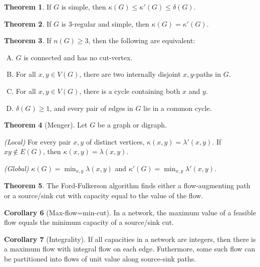 \documentclass{article}
\theoremstyle{definition}
\newtheorem{theorem}{Theorem}
\newtheorem{corollary}[theorem]{Corollary}
\begin{document}
\thispagestyle{empty}


\begin{theorem}
If $G$ is simple, then $\kappa(G)\leq \kappa'(G)\leq \delta(G)$.
\end{theorem}
\begin{theorem}
If $G$ is 3-regular and simple, then $\kappa(G)=\kappa'(G)$.
\end{theorem}

\begin{theorem}
If $n(G)\geq3$, then the following are equivalent:
\vspace{-0.5em}
\begin{enumerate}[A)] 
\setlength{\itemsep}{0pt}
\item $G$ is connected and has no cut-vertex.
\item For all $x,y\in V(G)$, there are two internally disjoint $x,y$-paths in $G$.
\item For all $x,y\in V(G)$, there is a cycle containing both $x$ and $y$.
\item $\delta(G)\geq1$, and every pair of edges in $G$ lie in a common cycle.
\end{enumerate}
\end{theorem}

\begin{theorem}[Menger]
Let $G$ be a graph or digraph.

\textit{(Local)} For every pair $x,y$ of distinct vertices, $\kappa(x,y)=\lambda'(x,y)$.
If $xy\notin E(G)$, then $\kappa(x,y)=\lambda(x,y)$.

\textit{(Global)}  $\kappa(G)=\min_{x,y} \lambda(x,y)$ and $\kappa'(G)=\min_{x,y} \lambda'(x,y)$.
\end{theorem}

\begin{theorem}
The Ford-Fulkerson algorithm finds either a flow-augmenting path or a source/sink cut with capacity equal to the value of the flow.
\end{theorem}
\begin{corollary}[Max-flow=min-cut]
In a network, the maximum value of a feasible flow equals the minimum capacity of a source/sink cut.
\end{corollary}
\begin{corollary}[Integrality]
If all capacities in a network are integers, then there is a maximum flow with integral flow on each edge.  Futhermore, some such flow can be partitioned into flows of unit value along source-sink paths.
\end{corollary}
\end{document}

